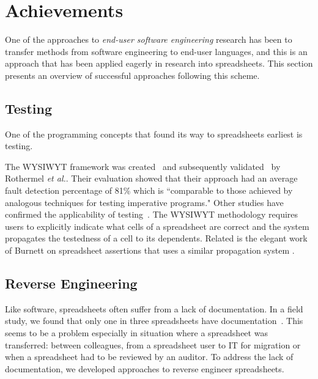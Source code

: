 \documentclass[conference]{IEEEtran}
\begin{document}
\section{Achievements} 
One of the approaches to \emph{end-user software engineering} research has been to transfer methods from software engineering to end-user languages, and this is an approach that has been applied eagerly in research into spreadsheets. This section presents an overview of successful approaches following this scheme.

\subsection{Testing}
One of the programming concepts that found its way to spreadsheets earliest is testing. 


The WYSIWYT framework was created~\cite{Rothermel1997} and subsequently validated~\cite{Rothermel2000} by Rothermel \emph{et al.}. Their evaluation showed that their approach had an average fault detection percentage of 81\% which is ``comparable to those achieved by analogous techniques for testing imperative programs." Other studies have confirmed the applicability of testing~\cite{Kruck2006}. The WYSIWYT methodology requires users to explicitly indicate what cells of a spreadsheet are correct and the system propagates the testedness of a cell to its dependents. Related is the elegant work of Burnett on spreadsheet assertions that uses a similar propagation system \cite{Burnett2003}.

\subsection{Reverse Engineering} 
Like software, spreadsheets often suffer from a lack of documentation. In a field study, we found that only one in three spreadsheets have documentation~\cite{hermans_supporting_2011}. This seems to be a problem especially in situation where a spreadsheet was transferred: between colleagues, from a spreadsheet user to IT for migration or when a spreadsheet had to be reviewed by an auditor. To address the lack of documentation, we developed approaches to reverse engineer spreadsheets.
\end{document}
